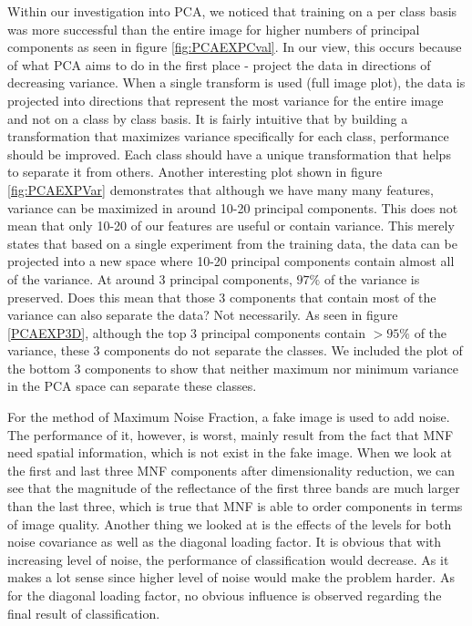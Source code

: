 \documentclass[conference,onecolumn]{IEEEtran}
\begin{document}
Within our investigation into PCA, we noticed that training on a per class basis was more successful than the entire image for higher numbers of principal components as seen in figure \ref{fig:PCAEXPCval}. In our view, this occurs because of what PCA aims to do in the first place - project the data in directions of decreasing variance. When a single transform is used (full image plot), the data is projected into directions that represent the most variance for the entire image and not on a class by class basis. It is fairly intuitive that by building a transformation that maximizes variance specifically for each class, performance should be improved. Each class should have a unique transformation that helps to separate it from others. Another interesting plot shown in figure \ref{fig:PCAEXPVar} demonstrates that although we have many many features, variance can be maximized in around 10-20 principal components. This does not mean that only 10-20 of our features are useful or contain variance. This merely states that based on a single experiment from the training data, the data can be projected into a new space where 10-20 principal components contain almost all of the variance. At around 3 principal components, $97\%$ of the variance is preserved. Does this mean that those 3 components that contain most of the variance can also separate the data? Not necessarily. As seen in figure \ref{PCAEXP3D}, although the top 3 principal components contain $>95\%$ of the variance, these 3 components do not separate the classes. We included the plot of the bottom 3 components to show that neither maximum nor minimum variance in the PCA space can separate these classes. 

For the method of Maximum Noise Fraction, a fake image is used to add noise. The performance of it, however, is worst, mainly result from the fact that MNF need spatial information, which is not exist in the fake image. When we look at the first and last three MNF components after dimensionality reduction, we can see that the magnitude of the reflectance of the first three bands are much larger than the last three, which is true that MNF is able to order components in terms of image quality. Another thing we looked at is the effects of the levels for both noise covariance as well as the diagonal loading factor. It is obvious that with increasing level of noise, the performance of classification would decrease. As it makes a lot sense since higher level of noise would make the problem harder. As for the diagonal loading factor, no obvious influence is observed regarding the final result of classification.
\end{document}
